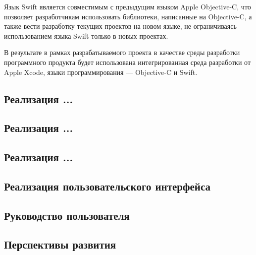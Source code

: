 Язык Swift является совместимым с предыдущим языком Apple Objective-C,
что позволяет разработчикам использовать библиотеки, написанные на Objective-C,
а также вести разработку текущих проектов на новом языке, не ограничиваясь
использованием языка Swift только в новых проектах.

В результате в рамках разрабатываемого проекта в качестве среды разработки
программного продукта будет использована интегрированная среда разработки
от Apple Xcode, языки программирования --- Objective-C и Swift.


\pagebreak

\subsection{Реализация ...}


\pagebreak

\subsection{Реализация ...}


\pagebreak

\subsection{Реализация ...}


\pagebreak

\subsection{Реализация пользовательского интерфейса}


\pagebreak

\subsection{Руководство пользователя}


\pagebreak

\subsection{Перспективы развития}

\pagebreak